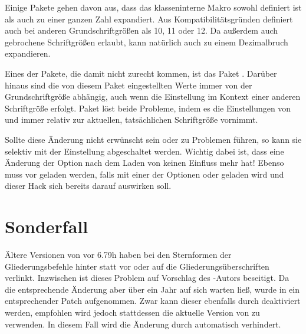 Einige Pakete gehen \iffalse grundsätzlich \fi %
davon aus, dass das klasseninterne Makro 
sowohl definiert ist als auch zu einer ganzen Zahl expandiert. Aus
Kompatibilitätsgründen definiert \KOMAScript{}  auch bei
anderen Grundschriftgrößen als 10, 11 oder 12. Da
\KOMAScript{} außerdem auch gebrochene Schriftgrößen erlaubt, kann
\iffalse dabei \fi %
 natürlich auch zu einem Dezimalbruch expandieren.

Eines der Pakete, die damit nicht zurecht
kommen, ist das Paket %
. Darüber hinaus sind die von diesem Paket
eingestellten Werte immer von der Grundschriftgröße abhängig, auch wenn die
Einstellung im Kontext einer anderen Schriftgröße erfolgt. Paket
 löst beide Probleme, indem es die Einstellungen von
 und  immer relativ zur aktuellen,
tatsächlichen Schriftgröße vornimmt.

Sollte diese Änderung nicht erwünscht sein oder zu Problemen führen, so kann
sie selektiv mit der Einstellung
abgeschaltet werden. Wichtig dabei ist, dass eine Änderung
der Option nach dem Laden von  keinen Einfluss mehr hat!
Ebenso muss  vor  geladen werden, falls
 mit einer der Optionen  oder
 geladen wird und dieser Hack sich bereits darauf
auswirken soll.


\section{Sonderfall }

Ältere Versionen von
 vor
6.79h haben bei den Sternformen der Gliederungsbefehle hinter statt vor oder
auf die Gliederungsüberschriften verlinkt. Inzwischen ist dieses Problem auf
Vorschlag des \KOMAScript-Autors beseitigt. Da die entsprechende Änderung aber
über ein Jahr auf sich warten ließ, wurde in  ein
entsprechender Patch aufgenommen. Zwar kann dieser ebenfalls durch
 deaktiviert werden, empfohlen wird jedoch
stattdessen die aktuelle Version von  zu verwenden. In
diesem Fall wird die Änderung durch  automatisch verhindert.



